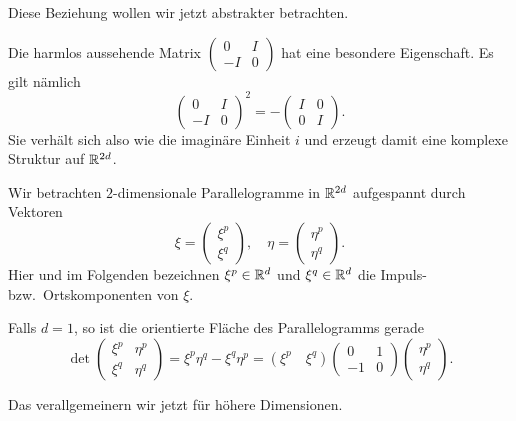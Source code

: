 Diese Beziehung wollen wir jetzt abstrakter betrachten.

\begin{bem}
	Die harmlos aussehende Matrix $\left(\begin{smallmatrix} 0 & I \\ -I & 0 \end{smallmatrix}\right)$ hat eine besondere Eigenschaft.
	Es gilt nämlich
	\begin{equation*}
		\begin{pmatrix} 0 & I \\ -I & 0 \end{pmatrix}^2
		= - \begin{pmatrix} I & 0 \\ 0 & I \end{pmatrix}.
	\end{equation*}
	Sie verhält sich also wie die imaginäre Einheit $i$ und erzeugt damit eine komplexe Struktur auf $\mathbb R^{2d}$.
\end{bem}

Wir betrachten $2$-dimensionale Parallelogramme in $\mathbb R^{2d}$ aufgespannt durch Vektoren
\begin{equation*}
	\xi = \begin{pmatrix} \xi^p \\ \xi^q \end{pmatrix},
	\quad
	\eta = \begin{pmatrix} \eta^p \\ \eta^q \end{pmatrix}.
\end{equation*}
Hier und im Folgenden bezeichnen $\xi^p \in \mathbb R^d$ und $\xi^q \in \mathbb R^d$ die Impuls- bzw.\ Ortskomponenten
von $\xi$.

Falls $d = 1$, so ist die orientierte Fläche des Parallelogramms gerade
\begin{equation*}
	\det\begin{pmatrix} \xi^p & \eta^p \\ \xi^q & \eta^q \end{pmatrix}
	= \xi^p \eta^q - \xi^q \eta^p
	= (\xi^p \quad \xi^q)
	\begin{pmatrix} 0 & 1 \\ -1 & 0 \end{pmatrix}
	\begin{pmatrix} \eta^p \\ \eta^q \end{pmatrix}.
\end{equation*}

Das verallgemeinern wir jetzt für höhere Dimensionen.

